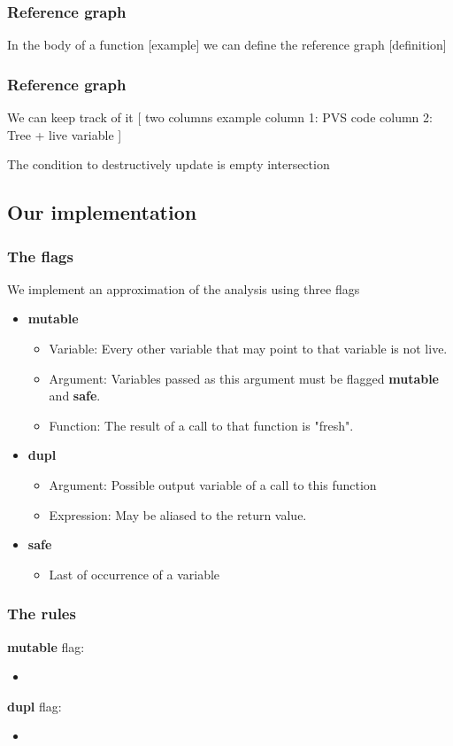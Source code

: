 \documentclass{beamer}
\begin{document}
\begin{frame}
\frametitle{Reference graph}
In the body of a function
[example]
we can define the reference graph
[definition]
\end{frame}

\begin{frame}
\frametitle{Reference graph}
We can keep track of it
[
two columns example
column 1: PVS code
column 2: Tree + live variable
]

The condition to destructively update is empty intersection
\end{frame}





\subsection{Our implementation}


\begin{frame}
\frametitle{The flags}
We implement an approximation of the analysis using three flags
\begin{itemize}
\itemsep1.5em
\item \textbf{mutable}
\begin{itemize}
\item Variable: Every other variable that may point to that variable is not live.
\item Argument: Variables passed as this argument must be flagged \textbf{mutable} and \textbf{safe}.
\item Function: The result of a call to that function is "fresh".
\end{itemize}
\item \textbf{dupl}
\begin{itemize}
\item Argument: Possible output variable of a call to this function
\item Expression: May be aliased to the return value.
\end{itemize}
\item \textbf{safe}
\begin{itemize}
\item Last of occurrence of a variable
\end{itemize}
\end{itemize}

\end{frame}


\begin{frame}
\frametitle{The rules}

\textbf{mutable} flag:
\begin{itemize}
\itemsep0em
\item 
\end{itemize}

\textbf{dupl} flag:
\begin{itemize}
\itemsep0em
\item 
\end{itemize}


\end{frame}
\end{document}
